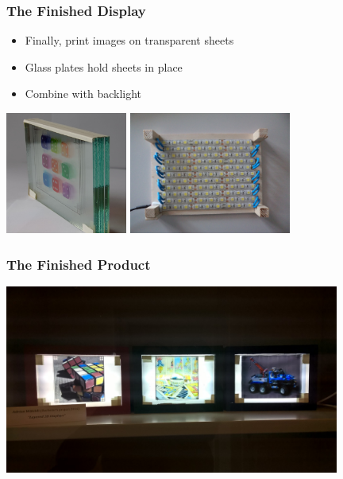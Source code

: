 \documentclass[12pt, compress]{beamer}
\begin{document}
\begin{frame}[fragile]
	\frametitle{The Finished Display}
	
	\begin{itemize}
		\item Finally, print images on transparent sheets
		\item Glass plates hold sheets in place
		\item Combine with backlight
	\end{itemize}
	
	\begin{center}
		\includegraphics[height=4cm]{images/glass_plates_front_view_cropped}
		\hspace{1cm}
		\includegraphics[height=4cm]{images/raw_backlight_from_top_reduced_resolution}
	\end{center}
\end{frame}

\begin{frame}[fragile]
	\frametitle{The Finished Product}
	\begin{center}
		\includegraphics[width=11cm]{images/all_displays_on}
	\end{center}
\end{frame}
\end{document}
